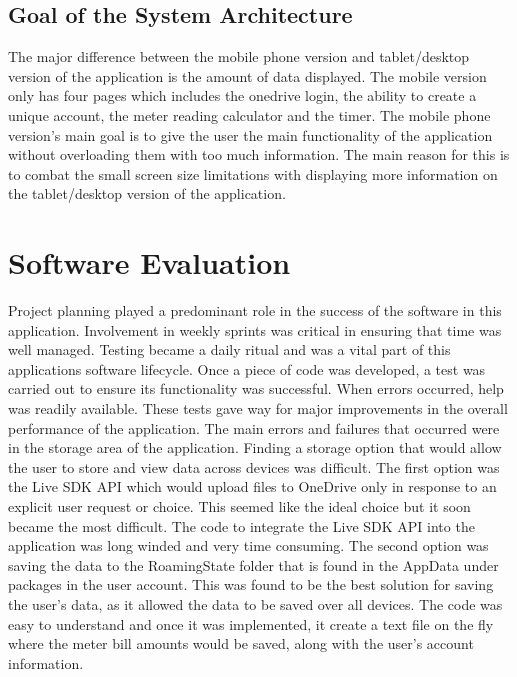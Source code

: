 \documentclass[runningheads,a4paper]{llncs}
\begin{document}
\subsection{Goal of the System Architecture}
\begin{inparaenum}[]
The major difference between the mobile phone version and tablet/desktop version of the application is the amount of data displayed. The mobile version only has four pages which includes the onedrive login, the ability to create a unique account, the meter reading calculator and the timer. The mobile phone version's main goal is to give the user the main functionality of the application without overloading them with too much information. The main reason for this is to combat the small screen size limitations with displaying more information on the tablet/desktop version of the application.
\end{inparaenum}

\section{Software Evaluation}
\label{sec:Software Evaluation}
Project planning played a predominant role in the success of the software in this application. Involvement in weekly sprints was critical in ensuring that time was well managed. Testing became a daily ritual and was a vital part of this applications software lifecycle. Once a piece of code was developed, a test was carried out to ensure its functionality was successful. When errors occurred, help was readily available. These tests gave way for major improvements in the overall performance of the application.
The main errors and failures that occurred were in the storage area of the application. Finding a storage option that would allow the user to store and view data across devices was difficult. The first option was the Live SDK API which would upload files to OneDrive only in response to an explicit user request or choice. This seemed like the ideal choice but it soon became the most difficult. The code to integrate the Live SDK API into the application was long winded and very time consuming. 
The second option was saving the data to the RoamingState folder that is found in the AppData under packages in the user account. This was found to be the best solution for saving the user's data, as it allowed the data to be saved over all devices. The code was easy to understand and once it was implemented, it create a text file on the fly where the meter bill amounts would be saved, along with the user's account information. 
\end{document}
